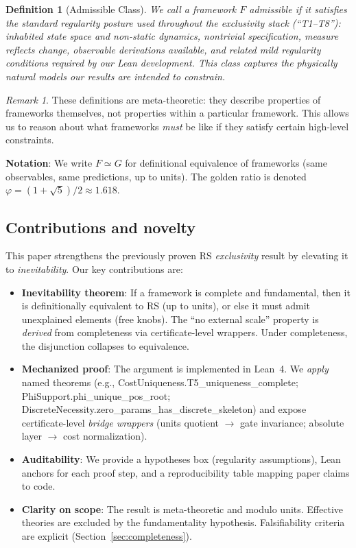 \documentclass[12pt]{article}
\newtheorem{definition}[theorem]{Definition}
\theoremstyle{remark}
\newtheorem{remark}[theorem]{Remark}
\begin{document}
\begin{definition}[Admissible Class]\label{def:admissible}
We call a framework $F$ \emph{admissible} if it satisfies the standard regularity posture used throughout the exclusivity stack (``T1--T8''):
inhabited state space and non-static dynamics, nontrivial specification, measure reflects change, observable derivations available, and related mild regularity conditions required by our Lean development. This class captures the physically natural models our results are intended to constrain.
\end{definition}

\begin{remark}
These definitions are meta-theoretic: they describe properties of frameworks themselves, not properties within a particular framework. This allows us to reason about what frameworks \emph{must} be like if they satisfy certain high-level constraints.
\end{remark}

\vspace{1em}
\noindent\textbf{Notation}: We write $F \simeq G$ for definitional equivalence of frameworks (same observables, same predictions, up to units). The golden ratio is denoted $\varphi = (1+\sqrt{5})/2 \approx 1.618$.

\subsection{Contributions and novelty}
This paper strengthens the previously proven RS \emph{exclusivity} result by elevating it to \emph{inevitability}. Our key contributions are:
\begin{itemize}
  \item \textbf{Inevitability theorem}: If a framework is complete and fundamental, then it is definitionally equivalent to RS (up to units), or else it must admit unexplained elements (free knobs). The ``no external scale'' property is \emph{derived} from completeness via certificate-level wrappers. Under completeness, the disjunction collapses to equivalence.
  \item \textbf{Mechanized proof}: The argument is implemented in Lean~4. We \emph{apply} named theorems (e.g., CostUniqueness.T5\_uniqueness\_complete; PhiSupport.phi\_unique\_pos\_root; DiscreteNecessity.zero\_params\_has\_discrete\_skeleton) and expose certificate-level \emph{bridge wrappers} (units quotient \(\to\) gate invariance; absolute layer \(\to\) cost normalization).
  \item \textbf{Auditability}: We provide a hypotheses box (regularity assumptions), Lean anchors for each proof step, and a reproducibility table mapping paper claims to code.
  \item \textbf{Clarity on scope}: The result is meta-theoretic and modulo units. Effective theories are excluded by the fundamentality hypothesis. Falsifiability criteria are explicit (Section~\ref{sec:completeness}).
\end{itemize}
\end{document}
